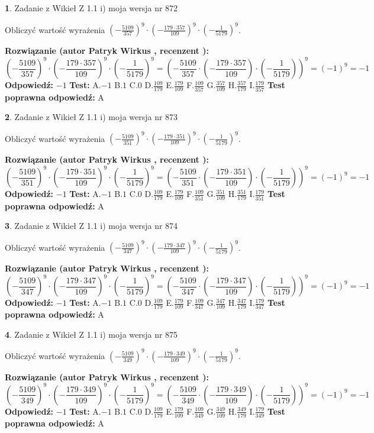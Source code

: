 \documentclass[12pt, a4paper]{article}
\theoremstyle{definition} %
\newtheorem{zad}{}
\newcommand{\zadStart}[1]{\begin{zad}#1\newline}
\newcommand{\zadStop}{\end{zad}}
\newcommand{\rozwStart}[2]{\noindent \textbf{Rozwiązanie (autor #1 , recenzent #2): }\newline}
\newcommand{\rozwStop}{\newline}
\newcommand{\odpStart}{\noindent \textbf{Odpowiedź:}\newline}
\newcommand{\odpStop}{\newline}
\newcommand{\testStart}{\noindent \textbf{Test:}\newline}
\newcommand{\testStop}{\newline}
\newcommand{\kluczStart}{\noindent \textbf{Test poprawna odpowiedź:}\newline}
\newcommand{\kluczStop}{\newline}
\begin{document}
\zadStart{Zadanie z Wikieł Z 1.1 i) moja wersja nr 872}

Obliczyć wartość wyrażenia $(-\frac{5109}{357})^{9} \cdot (-\frac{179 \cdot 357}{109})^{9} \cdot (-\frac{1}{5179})^{9}$.
\zadStop
\rozwStart{Patryk Wirkus}{}
$$(-\frac{5109}{357})^{9} \cdot (-\frac{179 \cdot 357}{109})^{9} \cdot (-\frac{1}{5179})^{9} = (-\frac{5109}{357} \cdot (-\frac{179 \cdot 357}{109}) \cdot (-\frac{1}{5179}))^{9} = (-1)^{9} = -1$$
\rozwStop
\odpStart
$-1$
\odpStop
\testStart
A.$-1$ B.$1$ C.$0$ D.$\frac{109}{179}$ E.$\frac{179}{109}$
F.$\frac{109}{357}$ G.$\frac{357}{109}$
H.$\frac{357}{179}$
I.$\frac{179}{357}$
\testStop
\kluczStart
A
\kluczStop



\zadStart{Zadanie z Wikieł Z 1.1 i) moja wersja nr 873}

Obliczyć wartość wyrażenia $(-\frac{5109}{351})^{9} \cdot (-\frac{179 \cdot 351}{109})^{9} \cdot (-\frac{1}{5179})^{9}$.
\zadStop
\rozwStart{Patryk Wirkus}{}
$$(-\frac{5109}{351})^{9} \cdot (-\frac{179 \cdot 351}{109})^{9} \cdot (-\frac{1}{5179})^{9} = (-\frac{5109}{351} \cdot (-\frac{179 \cdot 351}{109}) \cdot (-\frac{1}{5179}))^{9} = (-1)^{9} = -1$$
\rozwStop
\odpStart
$-1$
\odpStop
\testStart
A.$-1$ B.$1$ C.$0$ D.$\frac{109}{179}$ E.$\frac{179}{109}$
F.$\frac{109}{351}$ G.$\frac{351}{109}$
H.$\frac{351}{179}$
I.$\frac{179}{351}$
\testStop
\kluczStart
A
\kluczStop



\zadStart{Zadanie z Wikieł Z 1.1 i) moja wersja nr 874}

Obliczyć wartość wyrażenia $(-\frac{5109}{347})^{9} \cdot (-\frac{179 \cdot 347}{109})^{9} \cdot (-\frac{1}{5179})^{9}$.
\zadStop
\rozwStart{Patryk Wirkus}{}
$$(-\frac{5109}{347})^{9} \cdot (-\frac{179 \cdot 347}{109})^{9} \cdot (-\frac{1}{5179})^{9} = (-\frac{5109}{347} \cdot (-\frac{179 \cdot 347}{109}) \cdot (-\frac{1}{5179}))^{9} = (-1)^{9} = -1$$
\rozwStop
\odpStart
$-1$
\odpStop
\testStart
A.$-1$ B.$1$ C.$0$ D.$\frac{109}{179}$ E.$\frac{179}{109}$
F.$\frac{109}{347}$ G.$\frac{347}{109}$
H.$\frac{347}{179}$
I.$\frac{179}{347}$
\testStop
\kluczStart
A
\kluczStop



\zadStart{Zadanie z Wikieł Z 1.1 i) moja wersja nr 875}

Obliczyć wartość wyrażenia $(-\frac{5109}{349})^{9} \cdot (-\frac{179 \cdot 349}{109})^{9} \cdot (-\frac{1}{5179})^{9}$.
\zadStop
\rozwStart{Patryk Wirkus}{}
$$(-\frac{5109}{349})^{9} \cdot (-\frac{179 \cdot 349}{109})^{9} \cdot (-\frac{1}{5179})^{9} = (-\frac{5109}{349} \cdot (-\frac{179 \cdot 349}{109}) \cdot (-\frac{1}{5179}))^{9} = (-1)^{9} = -1$$
\rozwStop
\odpStart
$-1$
\odpStop
\testStart
A.$-1$ B.$1$ C.$0$ D.$\frac{109}{179}$ E.$\frac{179}{109}$
F.$\frac{109}{349}$ G.$\frac{349}{109}$
H.$\frac{349}{179}$
I.$\frac{179}{349}$
\testStop
\kluczStart
A
\kluczStop
\end{document}
